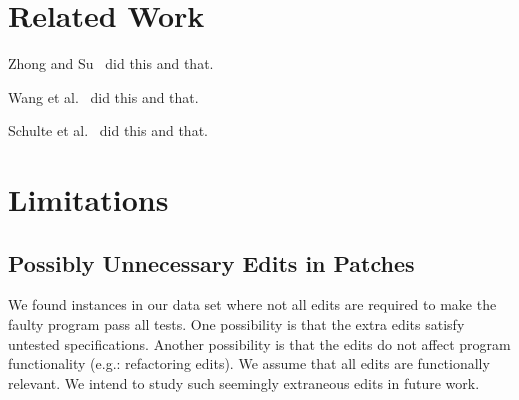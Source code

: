 \documentclass[sigconf, timestamp-false, anonymous=true]{acmart}
\begin{document}



\section{Related Work}
Zhong and Su~\cite{zhong2015} did this and that.

Wang et al.~\cite{wang2018} did this and that.

Schulte et al.~\cite{schulte} did this and that.

\section{Limitations}

\subsection{Possibly Unnecessary Edits in Patches}

We found instances in our data set where not all edits are required to 
make the faulty program pass all tests. One possibility is that the extra 
edits satisfy untested specifications. Another possibility is that the edits 
do not affect program functionality (e.g.: refactoring edits). We assume 
that all edits are functionally relevant. We intend to study such seemingly
extraneous edits in future work.



\end{document}
